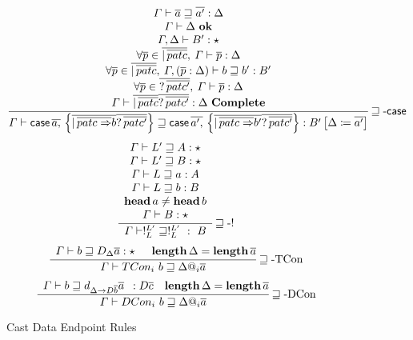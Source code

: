 \begin{figure}
\[
\frac{\begin{array}{c}
\varGamma\vdash\overline{a}\sqsupseteq\overline{a'}:\Delta\\
\varGamma\vdash\Delta\ \mathbf{ok}\\
\varGamma,\Delta\vdash B':\star\\
\forall\overline{p}\in\overline{|\,\overline{patc}},\:\varGamma\vdash\overline{p}:\Delta\\
\forall\overline{p}\in\overline{|\,\overline{patc}},\:\varGamma,\left(\overline{p}:\Delta\right)\vdash b\sqsupseteq b':B'\\
\forall\overline{p}\in\overline{?\,\overline{patc'}},\:\varGamma\vdash\overline{p}:\Delta\\
\varGamma\vdash\overline{|\,\overline{patc}}\overline{?\,\overline{patc'}}:\Delta\ \mathbf{Complete}
\end{array}}{
  \varGamma\vdash \case{} \,\overline{a,}\,\left\{ \overline{|\,\overline{patc\Rightarrow}b} \overline{?\,\overline{patc'}} \right\} \sqsupseteq \case{} \,\overline{a',}\,\left\{ \overline{|\,\overline{patc\Rightarrow}b'} \overline{?\,\overline{patc'}} \right\} :B'\left[\Delta\coloneqq\overline{a'}\right]
  }\rulename{\sqsupseteq-\case{}}
\]
\[
\frac{\begin{array}{c}
\varGamma\vdash L'\sqsupseteq A:\star\\
\varGamma\vdash L'\sqsupseteq B:\star\\
\varGamma\vdash L\sqsupseteq a:A\\
\varGamma\vdash L\sqsupseteq b:B\\
\mathbf{head}\,a\neq\mathbf{head}\,b\\
\varGamma\vdash B:\star
\end{array}}{\varGamma\vdash!_{L}^{L'}\sqsupseteq!_{L}^{L'}\ :\ B
}\operatorname{\sqsupseteq-!}
\]
\[
\frac{\begin{array}{c}
\varGamma\vdash b\sqsupseteq D_{\Delta}\overline{a}:\star\end{array}\quad\mathbf{length}\,\Delta=\mathbf{length}\,\overline{a}}{\varGamma\vdash TCon_{i}\ b\sqsupseteq\Delta@_{i}\overline{a}
}\rulename{\sqsupseteq-TCon}
\]
\[
\frac{\begin{array}{c}
\varGamma\vdash b\sqsupseteq d_{\Delta\rightarrow D\overline{b}}\overline{a}\end{array}:D\overline{c}\quad\mathbf{length}\,\Delta=\mathbf{length}\,\overline{a}}{\varGamma\vdash DCon_{i}\ b\sqsupseteq\Delta@_{i}\overline{a}
}\rulename{\sqsupseteq-DCon}
\]
  
\caption{Cast Data Endpoint Rules}
\label{fig:cast-Data-Endpoint-Rules}
\end{figure}

